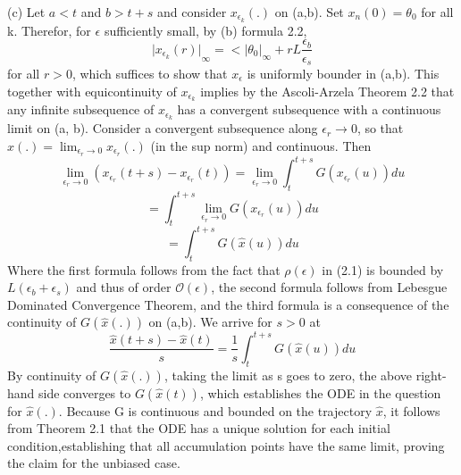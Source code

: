 \documentclass{article}
\begin{document}
(c) Let $a<t$ and $b>t+s$ and consider $x_{\epsilon_k}(.)$ on (a,b). Set $x_n(0)=\theta_0$ for all k. Therefor, for $\epsilon$ sufficiently small, by (b) formula 2.2,
$$ {\lvert x_{\epsilon_k}(r) \rvert}_\infty =< {\lvert \theta_0 \rvert}_\infty + rL\frac{\epsilon_b}{\epsilon_s} $$
for all $r>0$, which suffices to show that $x_\epsilon$ is uniformly bounder in (a,b). This together with equicontinuity of $x_{\epsilon_k}$ implies by the Ascoli-Arzela Theorem 2.2 that any infinite subsequence of $x_{\epsilon_k}$ has a convergent subsequence with a continuous limit on (a, b). Consider a convergent subsequence along $\epsilon_r \rightarrow 0$, so that $\hat{x}(.)=\lim_{\epsilon_r \rightarrow 0}x_{\epsilon_r}(.)$ (in the sup norm)  and continuous. Then 
$$ \lim_{\epsilon_r \rightarrow 0}(x_{\epsilon_r}(t+s)-x_{\epsilon_r}(t))=\lim_{\epsilon_r \rightarrow 0}\int_{t}^{t+s}G(x_{\epsilon_r}(u))du $$
$$ =\int_{t}^{t+s}\lim_{\epsilon_r \rightarrow 0}G(x_{\epsilon_r}(u))du $$
$$ =\int_{t}^{t+s}G(\hat{x}(u))du $$
Where the first formula follows from the fact that $\rho(\epsilon)$ in (2.1) is bounded by $L(\epsilon_b+\epsilon_s)$ and thus of order $\mathcal{O}(\epsilon)$, the second formula follows from Lebesgue Dominated Convergence Theorem, and the third formula is a consequence
of the continuity of $G(\hat{x}(.))$ on (a,b). We arrive for $s>0$ at
$$ \frac{\hat{x}(t+s)-\hat{x}(t)}{s}=\frac{1}{s}\int_{t}^{t+s}G(\hat{x}(u))du $$
By continuity of $G(\hat{x}(.))$, taking the limit as s goes to zero, the above right-hand side converges to $G(\hat{x}(t))$, which establishes the ODE in the question for $\hat{x}(.)$. Because G is continuous and bounded on the trajectory $\hat{x}$,  it follows from Theorem 2.1 that the ODE has a unique solution for each initial condition,establishing that all accumulation points have the same limit, proving the claim for the unbiased
case.
\end{document}
